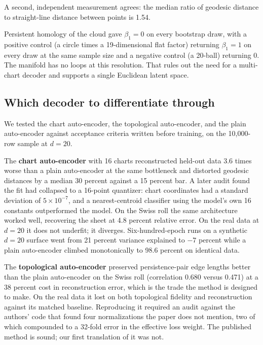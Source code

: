 \documentclass[11pt,a4paper]{article}
\begin{document}
A second, independent measurement agrees: the median ratio of geodesic distance to straight-line distance between points is 1.54.

Persistent homology of the cloud gave $\beta_1 = 0$ on every bootstrap draw, with a positive control (a circle times a 19-dimensional flat factor) returning $\beta_1 = 1$ on every draw at the same sample size and a negative control (a 20-ball) returning 0. The manifold has no loops at this resolution. That rules out the need for a multi-chart decoder and supports a single Euclidean latent space.

\subsection{Which decoder to differentiate through}

We tested the chart auto-encoder, the topological auto-encoder, and the plain auto-encoder against acceptance criteria written before training, on the 10{,}000-row sample at $d = 20$.

The \textbf{chart auto-encoder} with 16 charts reconstructed held-out data 3.6 times worse than a plain auto-encoder at the same bottleneck and distorted geodesic distances by a median 30 percent against a 15 percent bar. A later audit found the fit had collapsed to a 16-point quantizer: chart coordinates had a standard deviation of $5\times10^{-7}$, and a nearest-centroid classifier using the model's own 16 constants outperformed the model. On the Swiss roll the same architecture worked well, recovering the sheet at 4.8 percent relative error. On the real data at $d = 20$ it does not underfit; it diverges. Six-hundred-epoch runs on a synthetic $d = 20$ surface went from 21 percent variance explained to $-7$ percent while a plain auto-encoder climbed monotonically to 98.6 percent on identical data.

The \textbf{topological auto-encoder} preserved persistence-pair edge lengths better than the plain auto-encoder on the Swiss roll (correlation 0.680 versus 0.471) at a 38 percent cost in reconstruction error, which is the trade the method is designed to make. On the real data it lost on both topological fidelity and reconstruction against its matched baseline. Reproducing it required an audit against the authors' code that found four normalizations the paper does not mention, two of which compounded to a 32-fold error in the effective loss weight. The published method is sound; our first translation of it was not.
\end{document}
